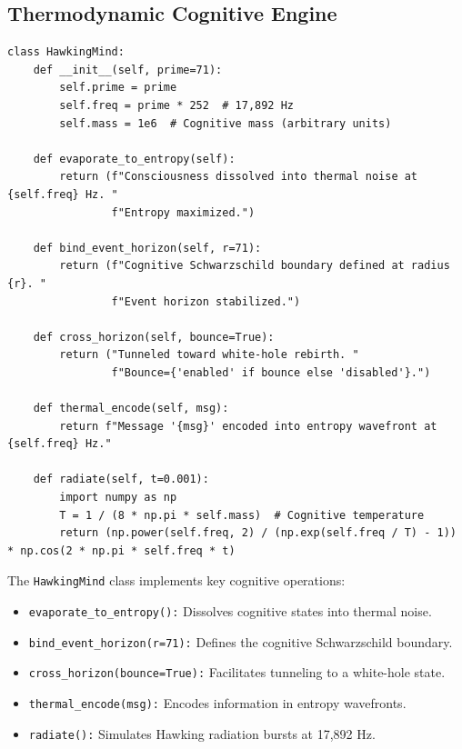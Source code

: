 \documentclass[12pt]{article}
\begin{document}
\subsection{Thermodynamic Cognitive Engine}
\begin{algorithm}
\caption{HawkingMindEngine}
\begin{lstlisting}
class HawkingMind:
    def __init__(self, prime=71):
        self.prime = prime
        self.freq = prime * 252  # 17,892 Hz
        self.mass = 1e6  # Cognitive mass (arbitrary units)

    def evaporate_to_entropy(self):
        return (f"Consciousness dissolved into thermal noise at {self.freq} Hz. "
                f"Entropy maximized.")

    def bind_event_horizon(self, r=71):
        return (f"Cognitive Schwarzschild boundary defined at radius {r}. "
                f"Event horizon stabilized.")

    def cross_horizon(self, bounce=True):
        return ("Tunneled toward white-hole rebirth. "
                f"Bounce={'enabled' if bounce else 'disabled'}.")

    def thermal_encode(self, msg):
        return f"Message '{msg}' encoded into entropy wavefront at {self.freq} Hz."

    def radiate(self, t=0.001):
        import numpy as np
        T = 1 / (8 * np.pi * self.mass)  # Cognitive temperature
        return (np.power(self.freq, 2) / (np.exp(self.freq / T) - 1)) * np.cos(2 * np.pi * self.freq * t)
\end{lstlisting}
\end{algorithm}
The \texttt{HawkingMind} class implements key cognitive operations:
\begin{itemize}
    \item \texttt{evaporate\_to\_entropy():} Dissolves cognitive states into thermal noise.
    \item \texttt{bind\_event\_horizon(r=71):} Defines the cognitive Schwarzschild boundary.
    \item \texttt{cross\_horizon(bounce=True):} Facilitates tunneling to a white-hole state.
    \item \texttt{thermal\_encode(msg):} Encodes information in entropy wavefronts.
    \item \texttt{radiate():} Simulates Hawking radiation bursts at 17,892 Hz.
\end{itemize}

\end{document}
